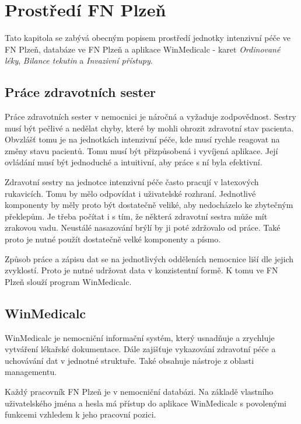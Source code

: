 \setlength{\parskip}{1em}

\chapter{Prostředí FN Plzeň}

Tato kapitola se zabývá obecným popisem prostředí jednotky intenzivní péče ve FN Plzeň, databáze ve FN Plzeň a aplikace WinMedicalc - karet \emph{Ordinované léky}, \emph{Bilance tekutin} a \emph{Invazivní přístupy}.

\section{Práce zdravotních sester}

Práce zdravotních sester v nemocnici je náročná a vyžaduje zodpovědnost. Sestry musí být pečlivé a nedělat chyby, které by mohli ohrozit zdravotní stav pacienta. Obvzlášť tomu je na jednotkách intenzivní péče, kde musí rychle reagovat na změny stavu pacientů. Tomu musí být přizpůsobená i vyvíjená aplikace. Její ovládání musí být jednoduché a intuitivní, aby práce s ní byla efektivní.

Zdravotní sestry na jednotce intenzivní péče často pracují v latexových rukavicích. Tomu by mělo odpovídat i uživatelské rozhraní. Jednotlivé komponenty by měly proto být dostatečně veliké, aby nedocházelo ke zbytečným překlepům. Je třeba počítat i s tím, že některá zdravotní sestra může mít zrakovou vadu. Neustálé nasazování brýlí by ji poté zdržovalo od práce. Také proto je nutné použít dostatečně velké komponenty a písmo.

Způsob práce a zápisu dat se na jednotlivých odděleních nemocnice liší dle jejich zvyklostí. Proto je nutné udržovat data v konzistentní formě. K tomu ve FN Plzeň slouží program WinMedicalc.

\section{WinMedicalc}

WinMedicalc je nemocniční informační systém, který usnadňuje a zrychluje vytváření lékařské dokumentace. Dále zajišťuje vykazování zdravotní péče a uchovávání dat v jednotné struktuře. Také obsahuje nástroje z oblasti managementu.

Každý pracovník FN Plzeň je v nemocniční databázi. Na základě vlastního uživatelského jména a hesla má přístup do aplikace WinMedicalc s povolenými funkcemi vzhledem k jeho pracovní pozici.

